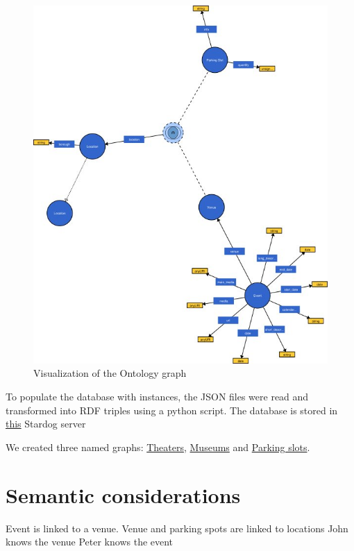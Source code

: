 \documentclass[runningheads,a4paper]{../../StyleFiles/llncs}
\begin{document}
\begin{figure}[ht]
	\centering
	\includegraphics[width=1\textwidth]{img/vocab-graph.jpg}
	\caption{Visualization of the Ontology graph}
	\label{fig:vocabulary}
\end{figure}

To populate the database with instances, the JSON files were read and transformed into RDF triples using a python script. The database is stored in \href{http://stardog.krw.d2s.labs.vu.nl/#/databases/group6}{this} Stardog server

We created three named graphs: \href{http://data.krw.d2s.labs.vu.nl/doc/group6/findaslot/resource/findaslot/theaters}{Theaters}, \href{http://data.krw.d2s.labs.vu.nl/doc/group6/findaslot/resource/findaslot/museums}{Museums} and \href{http://data.krw.d2s.labs.vu.nl/doc/group6/findaslot/resource/findaslot/parking-slots}{Parking slots}.


\section{Semantic considerations}
Event is linked to a venue. Venue and parking spots are linked to locations
John knows the venue
Peter knows the event
\end{document}
